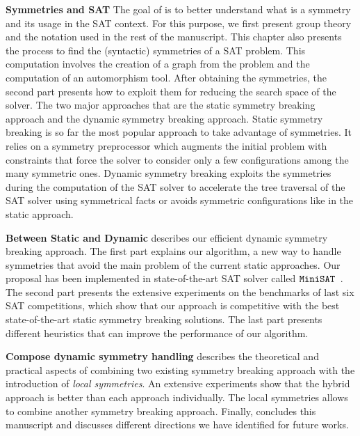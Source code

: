 \textbf{Symmetries and SAT}
The goal of  is to better understand what is a symmetry and its usage
in the SAT context. For this purpose, we first present group theory and the notation used
in the rest of the manuscript.
This chapter also presents the process to find the (syntactic) symmetries of a SAT problem.
 This computation involves the creation of a graph from the problem and the computation of an
automorphism tool. After obtaining the symmetries, the second part presents how to
exploit them for reducing the search space of the solver. The two major approaches that
are the static symmetry breaking approach and the dynamic symmetry breaking approach.
Static symmetry breaking is so far the most popular approach to take advantage of symmetries. It relies on a symmetry preprocessor which augments the initial problem with constraints that force the solver to consider only a few configurations among the many symmetric ones.
Dynamic symmetry breaking exploits the symmetries during the computation of the SAT solver to accelerate the
tree traversal of the SAT solver using symmetrical facts or avoids symmetric configurations like in the 
static approach.

\textbf{Between Static and Dynamic}
 describes our efficient dynamic symmetry breaking approach.
The first part explains our algorithm, a new way to handle symmetries that avoid the main problem
of the current static approaches. Our proposal has been implemented in state-of-the-art
SAT solver called $\texttt{MiniSAT}$~\cite{een2003extensible}. The second part presents the extensive experiments on the benchmarks of last six SAT competitions,
which show that our approach is competitive with the best state-of-the-art static symmetry breaking solutions.
The last part presents different heuristics that can improve the performance of our algorithm.

\textbf{Compose dynamic symmetry handling}
 describes the theoretical and practical aspects of combining two existing
symmetry  breaking approach with the introduction of \textit{local symmetries}.
 An extensive experiments show that the hybrid approach is better than 
each approach individually. The local symmetries allows to combine another 
symmetry breaking approach.
Finally,  concludes this manuscript and discusses different directions we have identified for future works.
 

